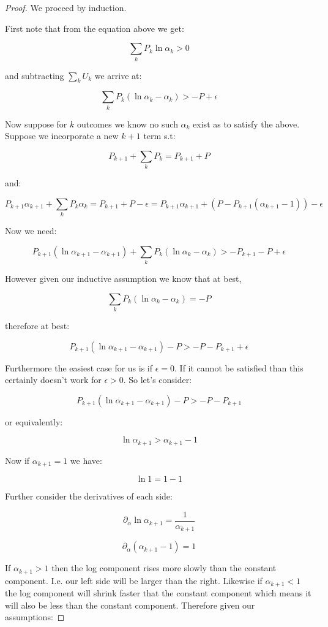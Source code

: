 \documentclass[11pt]{article}
\begin{document}
\begin{proof}

We proceed by induction. \newline

First note that from the equation above we get:

$$\sum_k P_k \ln \alpha_k > 0$$

and subtracting $\sum_k U_k$ we arrive at:

$$\sum_k P_k \left( \ln \alpha_k - \alpha_k \right) > -P+\epsilon$$

Now suppose for $k$ outcomes we know no such $\alpha_k$ exist as to satisfy the above. Suppose we incorporate a new $k+1$ term s.t:

$$P_{k+1} + \sum_k {P_k} = P_{k+1} + P$$ 

and:

$$P_{k+1}\alpha_{k+1} + \sum_k {P_k}\alpha_k = P_{k+1} + P - \epsilon = P_{k+1}\alpha_{k+1} + \left(P - P_{k+1}(\alpha_{k+1}-1) \right) - \epsilon$$ 

Now we need:

$$P_{k+1}\left(\ln \alpha_{k+1} - \alpha_{k+1}\right) + \sum_k P_k \left( \ln \alpha_k - \alpha_k \right) > -P_{k+1}-P+\epsilon$$

However given our inductive assumption we know that at best, 

$$\sum_k P_k \left( \ln \alpha_k - \alpha_k \right)=-P$$

therefore at best:

$$P_{k+1}\left(\ln \alpha_{k+1} - \alpha_{k+1}\right) - P > -P - P_{k+1} + \epsilon$$

Furthermore the easiest case for us is if $\epsilon=0$. If it cannot be satisfied than this certainly doesn't work for $\epsilon>0$. So let's consider:

$$P_{k+1}\left(\ln \alpha_{k+1} - \alpha_{k+1}\right) - P > -P - P_{k+1}$$

or equivalently:

$$\ln \alpha_{k+1}> \alpha_{k+1}-1$$

Now if $\alpha_{k+1}=1$ we have:

$$\ln 1 = 1-1$$

Further consider the derivatives of each side:

$$\partial_{\alpha}\ln \alpha_{k+1}=\frac{1}{\alpha_{k+1}}$$

$$\partial_{\alpha}(\alpha_{k+1}-1) = 1$$

If $\alpha_{k+1}> 1$ then the log component rises more slowly than the constant component. I.e. our left side will be larger than the right. Likewise if $\alpha_{k+1}<1$ the log component will shrink faster that the constant component which means it will also be less than the constant component. Therefore given our assumptions:


\end{proof}
\end{document}
